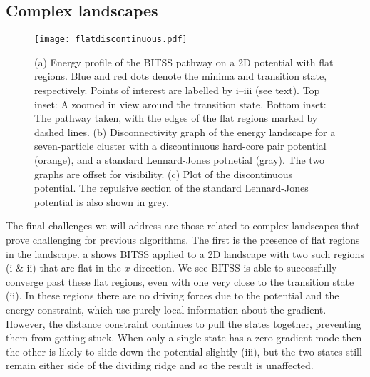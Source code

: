 \documentclass[twocolumn,10pt]{revtex4}
\begin{document}
\subsection{Complex landscapes}
\begin{figure}[tb]
  \texttt{[image: flatdiscontinuous.pdf]}
  \caption{\label{fig:flatdiscontinuous}
    (a) Energy profile of the BITSS pathway on a 2D potential with flat regions.
        Blue and red dots denote the minima and transition state, respectively.
        Points of interest are labelled by i--iii (see text).
        Top inset: A zoomed in view around the transition state.
        Bottom inset: The pathway taken, with the edges of the flat regions marked by dashed lines.
    (b) Disconnectivity graph of the energy landscape for a seven-particle cluster with a discontinuous hard-core pair potential (orange), and a standard Lennard-Jones potnetial (gray).
        The two graphs are offset for visibility.
    (c) Plot of the discontinuous potential.
        The repulsive section of the standard Lennard-Jones potential is also shown in grey.
  }
\end{figure}

The final challenges we will address are those related to complex landscapes that prove challenging for previous algorithms.
The first is the presence of flat regions in the landscape.
a shows BITSS applied to a 2D landscape with two such regions (i \& ii) that are flat in the $x$-direction.
We see BITSS is able to successfully converge past these flat regions, even with one very close to the transition state (ii).
In these regions there are no driving forces due to the potential and the energy constraint, which use purely local information about the gradient.
However, the distance constraint continues to pull the states together, preventing them from getting stuck.
When only a single state has a zero-gradient mode then the other is likely to slide down the potential slightly (iii), but the two states still remain either side of the dividing ridge and so the result is unaffected.
\end{document}

